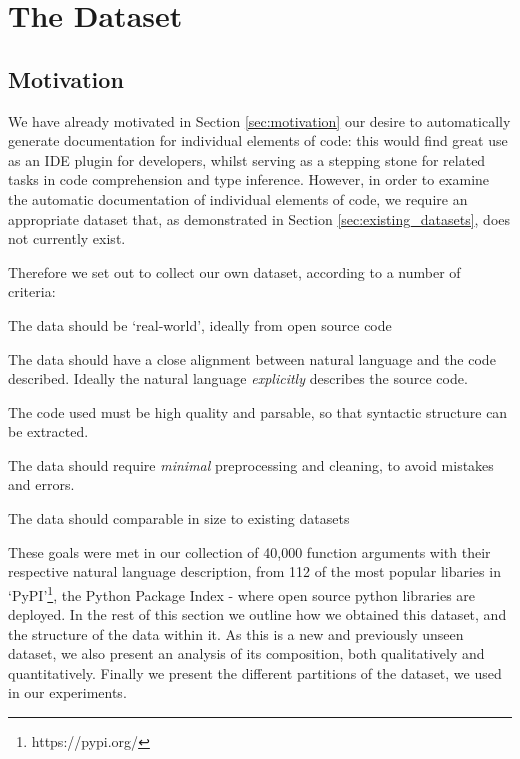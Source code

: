 \chapter{The Dataset}
\label{the_dataset}

\section{Motivation}

We have already motivated in Section \ref{sec:motivation} our desire to automatically generate documentation for individual elements of code: this would find great use as an IDE plugin for developers, whilst serving as a stepping stone for related tasks in code comprehension and type inference.
However, in order to examine the automatic documentation of individual elements of code, we require an appropriate dataset that, as demonstrated in Section \ref{sec:existing_datasets}, does not currently exist.

Therefore we set out to collect our own dataset, according to a number of criteria:

\begin{tight_enumerate}
    \item The data should be `real-world', ideally from open source code
    \item The data should have a close alignment between natural language and the code described. Ideally the natural language \textit{explicitly} describes the source code.
    \item The code used must be high quality and parsable, so that syntactic structure can be extracted.
    \item The data should require \textit{minimal} preprocessing and cleaning, to avoid mistakes and errors.
    \item The data should comparable in size to existing datasets
\end{tight_enumerate}

These goals were met in our collection of 40,000 function arguments with their respective natural language description, from 112 of the most popular libaries in `PyPI'\footnote{https://pypi.org/}, the Python Package Index - where open source python libraries are deployed. In the rest of this section we outline how we obtained this dataset, and the structure of the data within it. As this is a new and previously unseen dataset, we also present an analysis of its composition, both qualitatively and quantitatively.
Finally we present the different partitions of the dataset, we used in our experiments.



